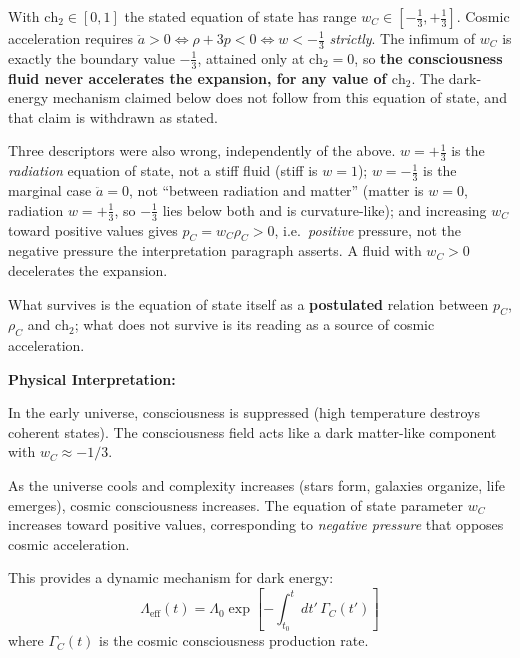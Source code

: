 \begin{remark}
\label{rem:wC-range-2026-10-03}
With $\text{ch}_2 \in [0,1]$ the stated equation of state has range
$w_C \in [-\tfrac13, +\tfrac13]$. Cosmic acceleration requires
$\ddot a > 0 \iff \rho + 3p < 0 \iff w < -\tfrac13$ \emph{strictly}. The
infimum of $w_C$ is exactly the boundary value $-\tfrac13$, attained only at
$\text{ch}_2 = 0$, so \textbf{the consciousness fluid never accelerates the
expansion, for any value of $\text{ch}_2$}. The dark-energy mechanism claimed
below does not follow from this equation of state, and that claim is withdrawn as
stated.

Three descriptors were also wrong, independently of the above.
$w = +\tfrac13$ is the \emph{radiation} equation of state, not a stiff fluid
(stiff is $w = 1$); $w = -\tfrac13$ is the marginal case $\ddot a = 0$, not
``between radiation and matter'' (matter is $w = 0$, radiation $w = +\tfrac13$,
so $-\tfrac13$ lies below both and is curvature-like); and increasing $w_C$
toward positive values gives $p_C = w_C\rho_C > 0$, i.e.\ \emph{positive}
pressure, not the negative pressure the interpretation paragraph asserts. A fluid
with $w_C > 0$ decelerates the expansion.

What survives is the equation of state itself as a \textbf{postulated} relation
between $p_C$, $\rho_C$ and $\text{ch}_2$; what does not survive is its reading
as a source of cosmic acceleration.
\end{remark}

\begin{level1}
\textbf{Physical Interpretation:}

In the early universe, consciousness is suppressed (high temperature destroys coherent states). The consciousness field acts like a dark matter-like component with $w_C \approx -1/3$.

As the universe cools and complexity increases (stars form, galaxies organize, life emerges), cosmic consciousness increases. The equation of state parameter $w_C$ increases toward positive values, corresponding to \textit{negative pressure} that opposes cosmic acceleration.

This provides a dynamic mechanism for dark energy:
\begin{equation}
\Lambda_{\text{eff}}(t) = \Lambda_0 \exp\left[ -\int_{t_0}^t dt' \, \Gamma_C(t') \right]
\end{equation}
where $\Gamma_C(t)$ is the cosmic consciousness production rate.
\end{level1}

